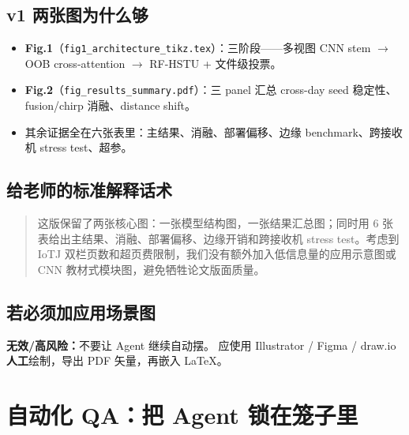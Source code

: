 \documentclass[11pt,a4paper]{ctexart}
\newcommand{\bad}[1]{\textcolor{red!70!black}{\textbf{无效/高风险：}#1}}
\begin{document}
\subsection{v1 两张图为什么够}
\begin{itemize}
  \item \textbf{Fig.1}（\texttt{fig1\_architecture\_tikz.tex}）：三阶段——多视图 CNN stem $\to$ OOB cross-attention $\to$ RF-HSTU + 文件级投票。
  \item \textbf{Fig.2}（\texttt{fig\_results\_summary.pdf}）：三 panel 汇总 cross-day seed 稳定性、fusion/chirp 消融、distance shift。
  \item 其余证据全在六张表里：主结果、消融、部署偏移、边缘 benchmark、跨接收机 stress test、超参。
\end{itemize}

\subsection{给老师的标准解释话术}
\begin{quote}\small
  这版保留了两张核心图：一张模型结构图，一张结果汇总图；同时用 6 张表给出主结果、消融、部署偏移、边缘开销和跨接收机 stress test。考虑到 IoTJ 双栏页数和超页费限制，我们没有额外加入低信息量的应用示意图或 CNN 教材式模块图，避免牺牲论文版面质量。
\end{quote}

\subsection{若必须加应用场景图}
\bad{不要让 Agent 继续自动摆。}
应使用 Illustrator / Figma / draw.io \textbf{人工}绘制，导出 PDF 矢量，再嵌入 LaTeX。

\section{自动化 QA：把 Agent 锁在笼子里}
\label{sec:qa}
\end{document}
